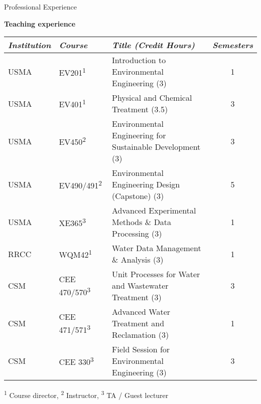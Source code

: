 \documentclass{resume} %
\begin{document}
\begin{rSection}{Professional Experience}
\\

\begin{table}[h]
\centering
\textbf{Teaching experience}
\begin{tabular}{lllc}
\toprule
  \emph{Institution} & \emph{Course} & \emph{Title (Credit Hours)} & \emph{Semesters}\\
\midrule			
  USMA & EV201\textsuperscript{1}& Introduction to Environmental Engineering (3) & 1  \\
  USMA & EV401\textsuperscript{1} & Physical and Chemical Treatment (3.5) & 3  \\
  USMA & EV450\textsuperscript{2} & Environmental Engineering for Sustainable Development (3) & 3 \\
  USMA & EV490/491\textsuperscript{2} & Environmental Engineering Design (Capstone) (3) & 5  \\
  USMA & XE365\textsuperscript{3} & Advanced Experimental Methods \& Data Processing (3) & 1  \\
  RRCC & WQM42\textsuperscript{1} & Water Data Management \& Analysis (3) & 1 \\
  CSM & CEE 470/570\textsuperscript{3} & Unit Processes for Water and Wastewater Treatment (3) & 3 \\
  CSM & CEE 471/571\textsuperscript{3} & Advanced Water Treatment and Reclamation (3) & 1 \\
  CSM & CEE 330\textsuperscript{3} & Field Session for Environmental Engineering (3) & 3  \\
\bottomrule
\end{tabular}

\smallskip\footnotesize{\textsuperscript{1} Course director, \textsuperscript{2} Instructor, \textsuperscript{3} TA / Guest lecturer}

\end{table}

\end{rSection}


\end{document}
